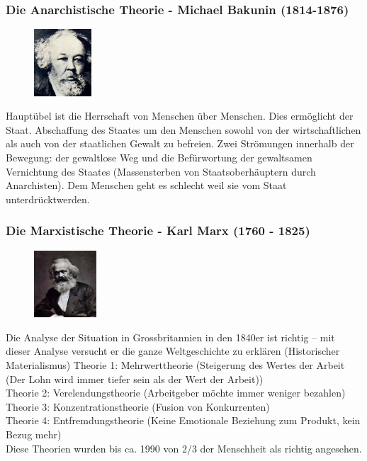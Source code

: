 \documentclass[10pt, openright=true]{scrartcl}
\begin{document}
\subsubsection{Die Anarchistische Theorie - Michael Bakunin (1814-1876)}
\begin{figure} 
\vspace{-0.5cm}
  \includegraphics[height=2.5cm]{images/bakunin}
\end{figure}
Hauptübel ist die Herrschaft von Menschen über Menschen. Dies ermöglicht der Staat. Abschaffung des Staates um den Menschen sowohl von der wirtschaftlichen als auch von der staatlichen Gewalt zu befreien. Zwei Strömungen innerhalb der Bewegung: der gewaltlose Weg und die Befürwortung der gewaltsamen Vernichtung des Staates (Massensterben von Staatsoberhäuptern durch Anarchisten). Dem Menschen geht es schlecht weil sie vom Staat \glqq unterdrückt\grqq werden.
\subsubsection{Die Marxistische Theorie - Karl Marx (1760 - 1825)}
\begin{figure}
\vspace{-0.5cm} 
  \includegraphics[height=2.5cm]{images/marx}
\end{figure}
Die Analyse der Situation in Grossbritannien in den 1840er ist richtig – mit dieser Analyse versucht er die ganze Weltgeschichte zu erklären (Historischer Materialismus)
Theorie 1: Mehrwerttheorie (Steigerung des Wertes der Arbeit (Der Lohn wird immer tiefer sein als der Wert der Arbeit))\\ Theorie 2: Verelendungstheorie (Arbeitgeber möchte immer weniger bezahlen) \\ Theorie 3: Konzentrationstheorie (Fusion von Konkurrenten) \\ Theorie 4: Entfremdungstheorie (Keine Emotionale Beziehung zum Produkt, kein Bezug mehr)\\
Diese Theorien wurden bis ca. 1990 von 2/3 der Menschheit als richtig angesehen.
\end{document}
